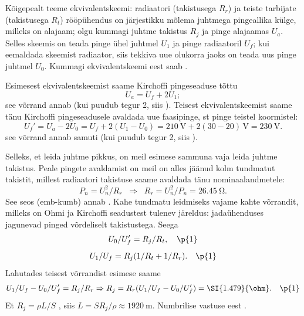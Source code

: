 Kõigepealt teeme ekvivalentskeemi: radiaatori (takistusega $R_r$) ja teiste tarbijate (takistusega $R_t$) rööpühendus on järjestikku mõlema juhtmega pingeallika külge, milleks on alajaam; olgu kummagi juhtme takistus $R_j$ ja pinge alajaamas $U_a$. Selles skeemis on teada pinge ühel juhtmel $U_1$ ja pinge radiaatoril $U_f$; kui eemaldada skeemist radiaator, siis tekkiva uue olukorra jaoks on teada uus pinge juhtmel $U_0$. Kummagi ekvivalentskeemi eest saab .

Esimesest ekvivalentskeemist saame Kirchoffi pingeseaduse tõttu 
$$U_a=U_f+2U_1;$$
see võrrand annab  (kui puudub tegur 2, siis ). 
Teisest ekvivalentskeemist saame tänu Kirchoffi pingeseadusele avaldada uue faasipinge, st pinge teistel koormistel:
$$U_f'=U_a-2U_0=U_f+2(U_1-U_0)=\SI{210}{\V} + 2(30-20)\,\si{\V} = \SI{230}{\V}.$$
see võrrand annab samuti  (kui puudub tegur 2, siis ).

Selleks, et leida juhtme pikkus, on meil esimese sammuna vaja leida juhtme takistus. Peale pingete avaldamist on meil on alles jäänud kolm tundmatut takistit, millest radiaatori takistuse saame avaldada tänu nominaalandmetele: 
$$P_n=U_n^2/R_r\;\; \Rightarrow\;\; R_r=U_n^2/P_n=\SI{26.45}{\ohm}.$$
See seos (emb-kumb) annab . Kahe tundmatu leidmiseks vajame kahte võrrandit, milleks on Ohmi ja Kirchoffi seadustest tulenev järeldus: jadaühenduses jagunevad pinged võrdeliselt takistustega. Seega
$$U_0/U_f'=R_j/R_t,\quad\p{1}$$
$$U_1/U_f=R_j(1/R_t+1/R_r).\quad\p{1}$$
Lahutades teisest võrrandist esimese saame
$$U_1/U_f-U_0/U_f'=R_j/R_r\Rightarrow R_j=R_r(U_1/U_f-U_0/U_f')=\SI{1.479}{\ohm}.\quad\p{1}$$
Et $R_j=\rho L/S$ , siis $L=SR_j/\rho\approx\SI{1920}{\m}$. Numbrilise vastuse eest .
\probend